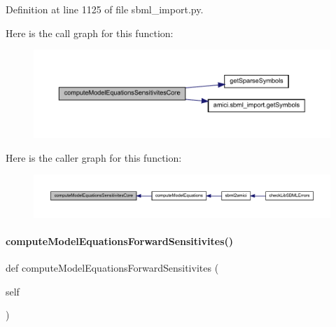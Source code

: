 Definition at line 1125 of file sbml\+\_\+import.\+py.

Here is the call graph for this function\+:
\nopagebreak
\begin{figure}[H]
\begin{center}
\leavevmode
\includegraphics[width=350pt]{classamici_1_1sbml__import_1_1_sbml_importer_a1f587cc58599d48e31ce68804357b142_cgraph}
\end{center}
\end{figure}
Here is the caller graph for this function\+:
\nopagebreak
\begin{figure}[H]
\begin{center}
\leavevmode
\includegraphics[width=350pt]{classamici_1_1sbml__import_1_1_sbml_importer_a1f587cc58599d48e31ce68804357b142_icgraph}
\end{center}
\end{figure}
\mbox{\label{classamici_1_1sbml__import_1_1_sbml_importer_a37b86397a43aca4fa926c6cfe6831f77}} 
\paragraph{\texorpdfstring{compute\+Model\+Equations\+Forward\+Sensitivites()}{computeModelEquationsForwardSensitivites()}}
{\footnotesize\ttfamily def compute\+Model\+Equations\+Forward\+Sensitivites (\begin{DoxyParamCaption}\item[{}]{self }\end{DoxyParamCaption})}

